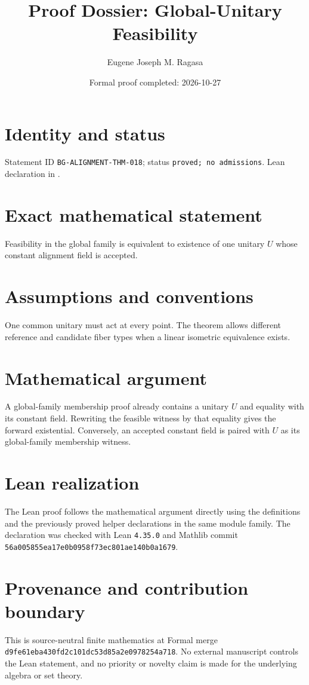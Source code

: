 \documentclass[11pt]{article}
\title{Proof Dossier: Global-Unitary Feasibility}
\author{Eugene Joseph M. Ragasa}
\date{Formal proof completed: 2026-10-27}
\begin{document}
\raggedright
\maketitle

\section{Identity and status}
Statement ID \texttt{BG-ALIGNMENT-THM-018}; status \texttt{proved; no admissions}.  Lean declaration
 in
.

\section{Exact mathematical statement}
Feasibility in the global family is equivalent to existence of one unitary $U$ whose constant alignment field is accepted.

\section{Assumptions and conventions}
One common unitary must act at every point.  The theorem allows different reference and candidate fiber types when a linear isometric equivalence exists.

\section{Mathematical argument}
A global-family membership proof already contains a unitary $U$ and equality with its constant field.  Rewriting the feasible witness by that equality gives the forward existential.  Conversely, an accepted constant field is paired with $U$ as its global-family membership witness.

\section{Lean realization}
The Lean proof follows the mathematical argument directly using the definitions and the
previously proved helper declarations in the same module family.  The declaration was checked
with Lean \texttt{4.35.0} and Mathlib commit \texttt{56a005855ea17e0b0958f73ec801ae140b0a1679}.

\section{Provenance and contribution boundary}
This is source-neutral finite mathematics at Formal merge
\texttt{d9fe61eba430fd2c101dc53d85a2e0978254a718}.  No external manuscript controls the Lean statement, and no priority or
novelty claim is made for the underlying algebra or set theory.
\end{document}

